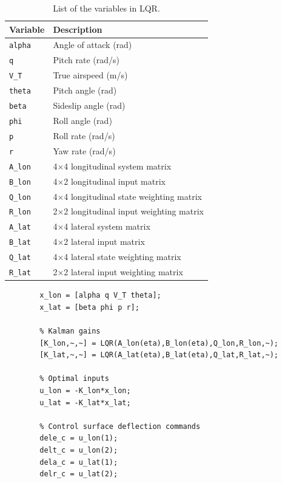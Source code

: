 \documentclass[a4paper, 12pt]{report}
\begin{document}
	\begin{table}[h]
		\centering
		\begin{tabular}{ll}
			\toprule
			\textbf{Variable} & \textbf{Description} \\
			\midrule
			\verb+alpha+ & Angle of attack (rad)\\
			\verb+q+ & Pitch rate (rad/s) \\
			\verb+V_T+ & True airspeed (m/s) \\
			\verb+theta+ & Pitch angle (rad) \\
			\verb+beta+ & Sideslip angle (rad) \\
			\verb+phi+ & Roll angle (rad) \\
			\verb+p+ & Roll rate (rad/s) \\
			\verb+r+ & Yaw rate (rad/s) \\
			\verb+A_lon+ & 4$\times$4 longitudinal system matrix \\
			\verb+B_lon+ & 4$\times$2 longitudinal input matrix \\
			\verb+Q_lon+ & 4$\times$4 longitudinal state weighting matrix \\
			\verb+R_lon+ & 2$\times$2 longitudinal input weighting matrix \\
			\verb+A_lat+ & 4$\times$4 lateral system matrix \\
			\verb+B_lat+ & 4$\times$2 lateral input matrix \\
			\verb+Q_lat+ & 4$\times$4 lateral state weighting matrix \\
			\verb+R_lat+ & 2$\times$2 lateral input weighting matrix \\
			\bottomrule
		\end{tabular}
		\caption{List of the variables in LQR.}
		\label{tab:lqr_variables}
	\end{table}
	
	\pagebreak
	
	\begin{lstlisting}[style=matlabFrameTB, gobble=4]
		% States
		x_lon = [alpha q V_T theta];
		x_lat = [beta phi p r];
		
		% Kalman gains
		[K_lon,~,~] = LQR(A_lon(eta),B_lon(eta),Q_lon,R_lon,~);
		[K_lat,~,~] = LQR(A_lat(eta),B_lat(eta),Q_lat,R_lat,~);
		
		% Optimal inputs
		u_lon = -K_lon*x_lon;
		u_lat = -K_lat*x_lat;
		
		% Control surface deflection commands
		dele_c = u_lon(1);
		delt_c = u_lon(2);
		dela_c = u_lat(1);
		delr_c = u_lat(2);
	\end{lstlisting}
	
\end{document}
